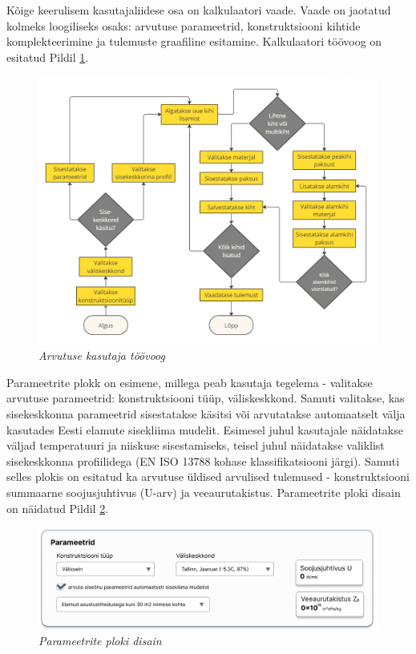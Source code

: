Kõige keerulisem kasutajaliidese osa on kalkulaatori vaade. Vaade on jaotatud kolmeks loogiliseks osaks:
arvutuse parameetrid, konstruktsiooni kihtide komplekteerimine ja tulemuste graafiline esitamine. 
Kalkulaatori töövoog on esitatud Pildil \ref{fig:desing_workflow}.
\begin{figure}[ht]
    \centering
    \includegraphics[width=1\textwidth]{figures/analysis/desing_workflow.png}
    \caption[Arvutuse kasutaja töövoog]{\textit{Arvutuse kasutaja töövoog}}
    \label{fig:desing_workflow}
\end{figure}

Parameetrite plokk on esimene, millega peab kasutaja tegelema 
- valitakse arvutuse parameetrid: konstruktsiooni tüüp, väliskeskkond. Samuti valitakse, kas 
sisekeskkonna parameetrid sisestatakse käsitsi või arvutatakse automaatselt välja kasutades 
Eesti elamute sisekliima mudelit. Esimesel juhul kasutajale näidatakse väljad temperatuuri ja 
niiskuse sisestamiseks, teisel juhul näidatakse valiklist sisekeskkonna profiilidega (EN ISO 13788 kohase
klassifikatsiooni järgi).  Samuti selles plokis on esitatud ka arvutuse üldised arvulised tulemused -
konstruktsiooni summaarne soojusjuhtivus (U-arv) ja veeaurutakistus. Parameetrite ploki disain
on näidatud Pildil \ref{fig:design_calc_parameters}.
\begin{figure}[ht]
    \centering
    \includegraphics[width=1\textwidth]{figures/analysis/desing_calc_parameters.png}
    \caption[Parameetrite ploki disain]{\textit{Parameetrite ploki disain}}
    \label{fig:design_calc_parameters}
\end{figure}

